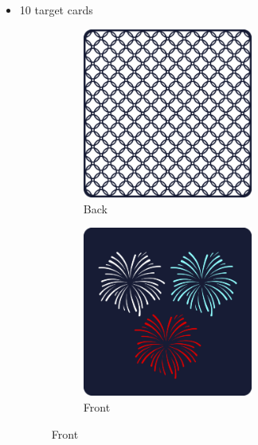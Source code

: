 \documentclass[a6paper, 12pt, parskip=half, DIV=14]{scrartcl}
\begin{document}
\begin{itemize}[nosep, leftmargin=*]
\begin{figure}[H]
\begin{subfigure}{0.3\textwidth}
				 \caption*{{\scriptsize Front}}
				 \end{subfigure} 
			\end{figure}      
      \item 10 target cards
      	\vspace{-1ex}      
			\begin{figure}[H]
			\centering
				\begin{subfigure}{0.3\textwidth}
				\centering
					\includegraphics[width=0.66\textwidth]{Images/target_card_back_display.png}
					\caption*{{\scriptsize Back}}
				\end{subfigure}
				\begin{subfigure}{0.3\textwidth}
				\centering
				 \includegraphics[width=0.66\textwidth]{Images/target_card_front_display.png} 
				 \caption*{{\scriptsize Front}}
				 \end{subfigure} 

\end{figure}
\end{itemize}
\end{document}

